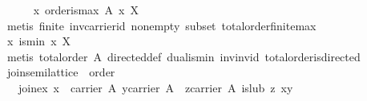 \begin{isabellebody}
\ \ \ \ \isamarkupfalse%
\ {}{}x{}\ order{}is{}max\ {}A{}{}\ x\ X{}\isanewline
\ \ \ \ \ \ \isamarkupfalse%
\ {}metis\ finite\ inv{}carrier{}id\ non{}empty\ subset\ total{}order{}finite{}max{}\isanewline
\ \ \ \ \isamarkupfalse%
\ {}{}x{}\ is{}min\ x\ X{}\isanewline
\ \ \ \ \ \ \isamarkupfalse%
\ {}metis\ {}total{}order\ {}A{}{}{}\ directed{}def\ dual{}is{}min\ inv{}inv{}id\ total{}order{}is{}directed{}\isanewline
\ \ \isamarkupfalse%
%
\endisatagproof
{\isafoldproof}%
%
\isadelimproof
\isanewline
%
\endisadelimproof
\isanewline
{}\isamarkupfalse%
%
\isamarkuptrue%
\isamarkupfalse%
\ join{}semilattice\ {}\ order\ {}\isanewline
\ \ \ join{}ex{}\ {}{}x\ {}\ carrier\ A{}\ y{}carrier\ A{}\ {}\ {}z{}carrier\ A{}\ is{}lub\ z\ {}x{}y{}{}\isanewline

\end{isabellebody}
